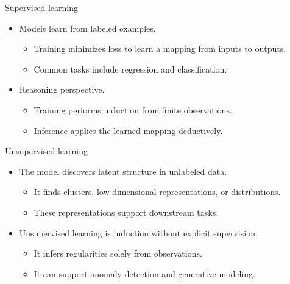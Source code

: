 \documentclass[12pt]{beamer}
\begin{document}
\begin{frame}{Supervised learning}
  \begin{itemize}
    \item Models learn from labeled examples.
      \begin{itemize}
        \item Training minimizes loss to learn a mapping from inputs to outputs.
        \item Common tasks include regression and classification.
      \end{itemize}
    \item Reasoning perspective.
      \begin{itemize}
        \item Training performs induction from finite observations.
        \item Inference applies the learned mapping deductively.
      \end{itemize}
  \end{itemize}
\end{frame}

\begin{frame}{Unsupervised learning}
  \begin{itemize}
    \item The model discovers latent structure in unlabeled data.
      \begin{itemize}
        \item It finds clusters, low-dimensional representations, or distributions.
        \item These representations support downstream tasks.
      \end{itemize}
    \item Unsupervised learning is induction without explicit supervision.
      \begin{itemize}
        \item It infers regularities solely from observations.
        \item It can support anomaly detection and generative modeling.
      \end{itemize}
  \end{itemize}
\end{frame}
\end{document}

